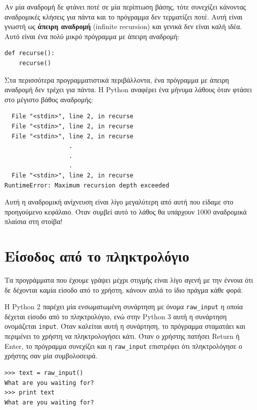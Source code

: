 \documentclass[10pt]{book}
\begin{document}
Αν μία αναδρομή δε φτάνει ποτέ σε μία περίπτωση βάσης, τότε συνεχίζει κάνοντας αναδρομικές κλήσεις για πάντα και το πρόγραμμα δεν τερματίζει ποτέ. Αυτή είναι γνωστή ως {\bf άπειρη αναδρομή} (infinite recursion) και γενικά δεν είναι καλή ιδέα. Αυτό είναι ένα πολύ μικρό πρόγραμμα με άπειρη αναδρομή:

\begin{verbatim}
def recurse():
    recurse()
\end{verbatim}
%

Στα περισσότερα προγραμματιστικά περιβάλλοντα, ένα πρόγραμμα με άπειρη αναδρομή δεν τρέχει για πάντα. Η Python αναφέρει ένα μήνυμα λάθους όταν φτάσει στο μέγιστο βάθος αναδρομής:

\begin{verbatim}
  File "<stdin>", line 2, in recurse
  File "<stdin>", line 2, in recurse
  File "<stdin>", line 2, in recurse
                  .
                  .
                  .
  File "<stdin>", line 2, in recurse
RuntimeError: Maximum recursion depth exceeded
\end{verbatim}
%

Αυτή η αναδρομική ανίχνευση είναι λίγο μεγαλύτερη από αυτή που είδαμε στο προηγούμενο κεφάλαιο. Όταν συμβεί αυτό το λάθος θα υπάρχουν 1000 αναδρομικά πλαίσια στη στοίβα!


\section{Είσοδος από το πληκτρολόγιο}

Τα προγράμματα που έχουμε γράψει μέχρι στιγμής είναι λίγο αγενή με την έννοια ότι δε δέχονται καμία είσοδο από το χρήστη, κάνουν απλά το ίδιο πράγμα κάθε φορά.

Η Python 2 παρέχει μία ενσωματωμένη συνάρτηση με όνομα \verb"raw_input" η οποία δέχεται είσοδο από το πληκτρολόγιο, ενώ στην Python 3 αυτή η συνάρτηση ονομάζεται {\tt input}. Όταν καλείται αυτή η συνάρτηση, το πρόγραμμα σταματάει και περιμένει το χρήστη να πληκτρολογήσει κάτι. Όταν ο χρήστης πατήσει {\sf Return} ή {\sf Enter}, το πρόγραμμα συνεχίζει και η  \verb"raw_input" επιστρέφει ότι πληκτρολόγησε ο χρήστης σαν μία συμβολοσειρά.

\begin{verbatim}
>>> text = raw_input()
What are you waiting for?
>>> print text
What are you waiting for?
\end{verbatim}
%
\end{document}
